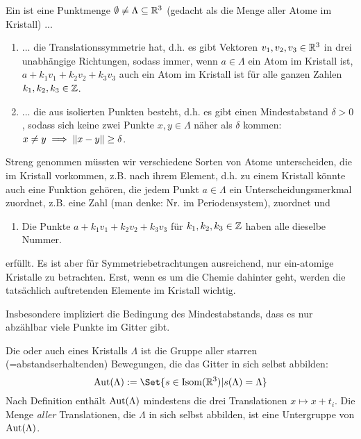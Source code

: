 
\begin{definition}[Kristalle]
Ein  ist eine Punktmenge $\emptyset\neq\Lambda\subseteq\mathbb{R}^3$ (gedacht als die Menge aller Atome im Kristall) ...
\begin{enumerate}
\item ... die Translationssymmetrie hat, d.h. es gibt Vektoren $v_1,v_2,v_3\in\mathbb{R}^3$ in drei unabhängige Richtungen, sodass immer, wenn $a\in\Lambda$ ein Atom im Kristall ist, $a+k_1v_1+k_2v_2+k_3v_3$ auch ein Atom im Kristall ist für alle ganzen Zahlen $k_1,k_2,k_3\in\mathbb{Z}$.
\item ... die aus isolierten Punkten besteht, d.h. es gibt einen Mindestabstand $\delta>0$, sodass sich keine zwei Punkte $x,y\in\Lambda$ näher als $\delta$ kommen: $x\neq y \implies\lVert x-y\rVert\geq\delta$.
\end{enumerate}
Streng genommen müssten wir verschiedene Sorten von Atome unterscheiden, die im Kristall vorkommen, z.B. nach ihrem Element, d.h. zu einem Kristall könnte auch eine Funktion gehören, die jedem Punkt $a\in\Lambda$ ein Unterscheidungsmerkmal zuordnet, z.B. eine Zahl (man denke: Nr. im Periodensystem), zuordnet und
\begin{enumerate}[resume]
\item Die Punkte $a+k_1v_1+k_2v_2+k_3v_3$ für $k_1,k_2,k_3\in\mathbb{Z}$ haben alle dieselbe Nummer.
\end{enumerate}
erfüllt. Es ist aber für Symmetriebetrachtungen ausreichend, nur ein-atomige Kristalle zu betrachten. Erst, wenn es um die Chemie dahinter geht, werden die tatsächlich auftretenden Elemente im Kristall wichtig.
\end{definition}

\begin{remark}
Insbesondere impliziert die Bedingung des Mindestabstands, dass es nur abzählbar viele Punkte im Gitter gibt.
\end{remark}

\begin{definition}
Die  oder auch  eines Kristalls $\Lambda$ ist die Gruppe aller starren (=abstandserhaltenden) Bewegungen, die das Gitter in sich selbst abbilden:
\[\Aut(\Lambda) := \Set{s\in \operatorname{Isom}(\IR^3) | s(\Lambda)=\Lambda}\]
Nach Definition enthält $\operatorname{Aut}(\Lambda)$ mindestens die drei Translationen $x\mapsto x+t_i$. Die Menge \emph{aller} Translationen, die $\Lambda$ in sich selbst abbilden, ist eine Untergruppe von $\operatorname{Aut}(\Lambda)$.
\end{definition}

